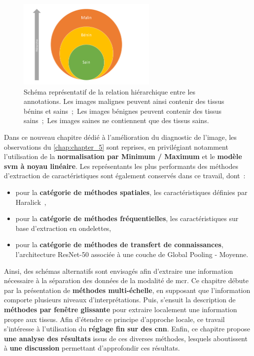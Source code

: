 \begin{figure}[H]
    \centering
    \includegraphics[width=0.6\textwidth]{contents/chapter_6/resources/scheme_image_improvement_annotations_hierarchy.pdf}
    \caption{Schéma représentatif de la relation hiérarchique entre les annotations. Les images malignes peuvent ainsi contenir des tissus bénins et sains~;~Les images bénignes peuvent contenir des tissus sains~;~Les images saines ne contiennent que des tissus sains.}
    \label{fig:scheme_image_improvement_annotations_hierarchy}
\end{figure}\par

Dans ce nouveau chapitre dédié à l'amélioration du diagnostic de l'image, les observations du \cref{chap:chapter_5} sont reprises, en privilégiant notamment l'utilisation de la \textbf{normalisation par Minimum / Maximum} et le \textbf{modèle \gls{svm} à noyau linéaire}. Les représentants les plus performants des méthodes d'extraction de caractéristiques sont également conservés dans ce travail, dont~:
\begin{itemize}
    \item pour la \textbf{catégorie de méthodes spatiales}, les caractéristiques définies par Haralick~,
    \item pour la \textbf{catégorie de méthodes fréquentielles}, les caractéristiques sur base d'extraction en ondelettes,
    \item pour la \textbf{catégorie de méthodes de transfert de connaissances}, l'architecture ResNet-50 associée à une couche de Global Pooling - Moyenne.
\end{itemize}\par

Ainsi, des schémas alternatifs sont envisagés afin d'extraire une information nécessaire à la séparation des données de la modalité de \gls{mcr}. Ce chapitre débute par la présentation de \textbf{méthodes multi-échelle}, en supposant que l'information comporte plusieurs niveaux d'interprétations. Puis, s'ensuit la description de \textbf{méthodes par fenêtre glissante} pour extraire localement une information propre aux tissus. Afin d'étendre ce principe d'approche locale, ce travail s'intéresse à l'utilisation du \textbf{réglage fin sur des \gls{cnn}}. Enfin, ce chapitre propose \textbf{une analyse des résultats} issus de ces diverses méthodes, lesquels aboutissent à \textbf{une discussion} permettant d'approfondir ces résultats.\par
\clearpage

